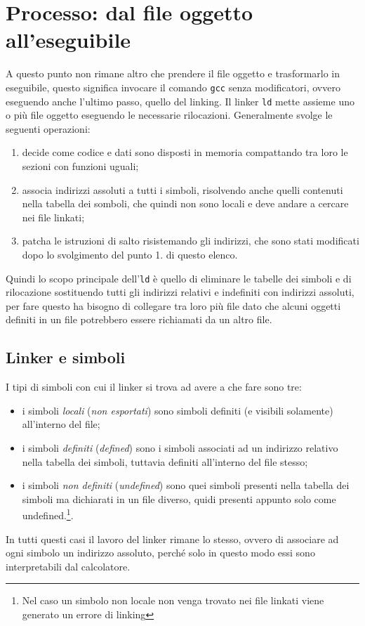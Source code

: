 \documentclass[class=book, crop=false, oneside]{standalone}
\begin{document}
\section{Processo: dal file oggetto all'eseguibile}
A questo punto non rimane altro che prendere il file oggetto e trasformarlo in eseguibile, questo significa invocare il comando \texttt{gcc} senza modificatori, ovvero eseguendo anche l'ultimo passo, quello del linking.
Il linker \texttt{ld} mette assieme uno o più file oggetto eseguendo le necessarie rilocazioni. Generalmente svolge le seguenti operazioni:
\begin{enumerate}
	\item decide come codice e dati sono disposti in memoria compattando tra loro le sezioni con funzioni uguali;
	\item associa indirizzi assoluti a tutti i simboli, risolvendo anche quelli contenuti nella tabella dei somboli, che quindi non sono locali e deve andare a cercare nei file  linkati;
	\item patcha le istruzioni di salto risistemando gli indirizzi, che sono stati modificati dopo lo svolgimento del punto 1. di questo elenco.
\end{enumerate}
Quindi lo scopo principale dell'\texttt{ld} è quello di eliminare le tabelle dei simboli e di rilocazione sostituendo tutti gli indirizzi relativi e indefiniti con indirizzi assoluti, per fare questo ha bisogno di collegare tra loro più file  dato che alcuni oggetti definiti in un file potrebbero essere richiamati da un altro file.

\subsection{Linker e simboli}
I tipi di simboli con cui il linker si trova ad avere a che fare sono tre:
\begin{itemize}
	\item i simboli \emph{locali} (\emph{non esportati}) sono simboli definiti (e visibili solamente) all'interno del file;
	\item i simboli \emph{definiti} (\emph{defined}) sono i simboli associati ad un indirizzo relativo nella tabella dei simboli, tuttavia definiti all'interno del file stesso;
	\item i simboli \emph{non definiti} (\emph{undefined}) sono quei simboli presenti nella tabella dei simboli ma dichiarati in un file diverso, quidi presenti appunto solo come undefined.\footnote{Nel caso un simbolo non locale non venga trovato nei file  linkati viene generato un errore di linking}.
\end{itemize}
In tutti questi casi il lavoro del linker rimane lo stesso, ovvero di associare ad ogni simbolo un indirizzo assoluto, perché solo in questo modo essi sono interpretabili dal calcolatore.
\end{document}
